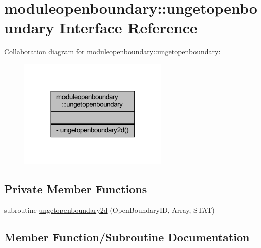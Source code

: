 \hypertarget{interfacemoduleopenboundary_1_1ungetopenboundary}{}\section{moduleopenboundary\+:\+:ungetopenboundary Interface Reference}
\label{interfacemoduleopenboundary_1_1ungetopenboundary}


Collaboration diagram for moduleopenboundary\+:\+:ungetopenboundary\+:\nopagebreak
\begin{figure}[H]
\begin{center}
\leavevmode
\includegraphics[width=204pt]{interfacemoduleopenboundary_1_1ungetopenboundary__coll__graph}
\end{center}
\end{figure}
\subsection*{Private Member Functions}
\begin{DoxyCompactItemize}
\item 
subroutine \mbox{\hyperlink{interfacemoduleopenboundary_1_1ungetopenboundary_a7f91b94d3d5ca09b287bac709da2483f}{ungetopenboundary2d}} (Open\+Boundary\+ID, Array, S\+T\+AT)
\end{DoxyCompactItemize}


\subsection{Member Function/\+Subroutine Documentation}
\mbox{\label{interfacemoduleopenboundary_1_1ungetopenboundary_a7f91b94d3d5ca09b287bac709da2483f}} 
